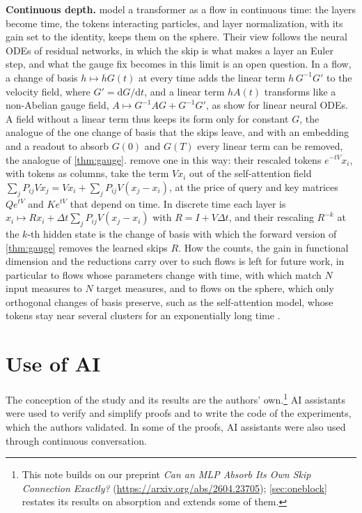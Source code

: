 \documentclass[10pt]{article}
\theoremstyle{definition}
\theoremstyle{remark}
\newcommand{\para}[1]{\smallskip\noindent\textbf{#1}\hspace{0.5em}}
\newif\ifanon \anonfalse
\begin{document}
\para{Continuous depth.} \citet{geshkovski2025transformers} model a transformer as a flow in continuous time: the layers become time, the tokens interacting particles, and layer normalization, with its gain set to the identity, keeps them on the sphere. Their view follows the neural ODEs of residual networks, in which the skip is what makes a layer an Euler step, and what the gauge fix becomes in this limit is an open question. In a flow, a change of basis $h \mapsto hG(t)$ at every time adds the linear term $h\,G^{-1}G'$ to the velocity field, where $G' = \mathrm{d}G/\mathrm{d}t$, and a linear term $hA(t)$ transforms like a non-Abelian gauge field, $A \mapsto G^{-1}AG + G^{-1}G'$, as \citet{hashimoto2024unification} show for linear neural ODEs. A field without a linear term thus keeps its form only for constant $G$, the analogue of the one change of basis that the skips leave, and with an embedding and a readout to absorb $G(0)$ and $G(T)$ every linear term can be removed, the analogue of \cref{thm:gauge}. \citet{geshkovski2023clusters} remove one in this way: their rescaled tokens $e^{-tV}x_i$, with tokens as columns, take the term $Vx_i$ out of the self-attention field $\sum_j P_{ij}Vx_j = Vx_i + \sum_j P_{ij}V(x_j - x_i)$, at the price of query and key matrices $Qe^{tV}$ and $Ke^{tV}$ that depend on time. In discrete time each layer is $x_i \mapsto Rx_i + \Delta t\sum_j P_{ij}V(x_j - x_i)$ with $R = I + V\Delta t$, and their rescaling $R^{-k}$ at the $k$-th hidden state \citep[Remark~3.4]{geshkovski2023clusters} is the change of basis with which the forward version of \cref{thm:gauge} removes the learned skips $R$. How the counts, the gain in functional dimension and the reductions carry over to such flows is left for future work, in particular to flows whose parameters change with time, with which \citet{geshkovski2026measure} match $N$ input measures to $N$ target measures, and to flows on the sphere, which only orthogonal changes of basis preserve, such as the self-attention model, whose tokens stay near several clusters for an exponentially long time \citep{geshkovski2024metastability}.

\section*{Use of AI}
The conception of the study and its results are the authors' own.\ifanon\else\footnote{This note builds on our preprint \emph{Can an MLP Absorb Its Own Skip Connection Exactly?} (\url{https://arxiv.org/abs/2604.23705}); \cref{sec:oneblock} restates its results on absorption and extends some of them.}\fi{} AI assistants were used to verify and simplify proofs and to write the code of the experiments, which the authors validated. In some of the proofs, AI assistants were also used through continuous conversation.
\end{document}
